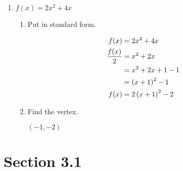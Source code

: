 \documentclass[landscape]{exam}
\begin{document}
\begin{enumerate}
\begin{enumerate}[a]
      \end{enumerate}

    \item $f(x) = 2x^2 + 4x$ 
      \begin{enumerate}[a]
        \item Put in standard form.
          \begin{solution}
            \begin{align*}
              f(x)           &= 2x^2 + 4x \\
              \frac{f(x)}{2} &= x^2 + 2x \\
                             &= x^2 + 2x + 1 - 1 \\
                             &= \del{x + 1}^2 - 1 \\
              f(x)           &= 2\del{x + 1}^2 - 2 \\
            \end{align*}
          \end{solution}
        \item Find the vertex.
          \begin{solution}
            $ (-1, -2) $
          \end{solution}

      \end{enumerate}

  \end{enumerate}

  \pagebreak

  \section{Section 3.1}
\end{document}
